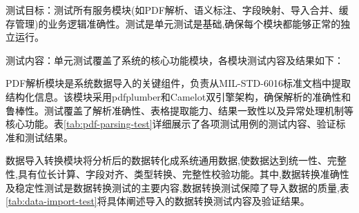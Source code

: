 测试目标：测试所有服务模块(如PDF解析、语义标注、字段映射、导入合并、缓存管理)的业务逻辑准确性。测试是单元测试是基础,确保每个模块都能够正常的独立运行。

测试内容：单元测试覆盖了系统的核心功能模块，各模块测试内容及结果如下：

PDF解析模块是系统数据导入的关键组件，负责从MIL-STD-6016标准文档中提取结构化信息。该模块采用pdfplumber和Camelot双引擎架构，确保解析的准确性和鲁棒性。测试覆盖了解析准确性、表格提取能力、结果一致性以及异常处理机制等核心功能。表\ref{tab:pdf-parsing-test}详细展示了各项测试用例的测试内容、验证标准和测试结果。

\begin{table}[H]
\centering
\caption{PDF解析模块单元测试结果}
\label{tab:pdf-parsing-test}
\end{table}

数据导入转换模块将分析后的数据转化成系统通用数据,使数据达到统一性、完整性,具有位长计算、字段对齐、类型转换、完整性校验功能。其中,数据转换准确性及稳定性测试是数据转换测试的主要内容,数据转换测试保障了导入数据的质量,表\ref{tab:data-import-test}将具体阐述导入的数据转换测试内容及验证结果。

\begin{table}[H]
\centering
\caption{数据导入转换模块单元测试结果}
\label{tab:data-import-test}
\end{table}

